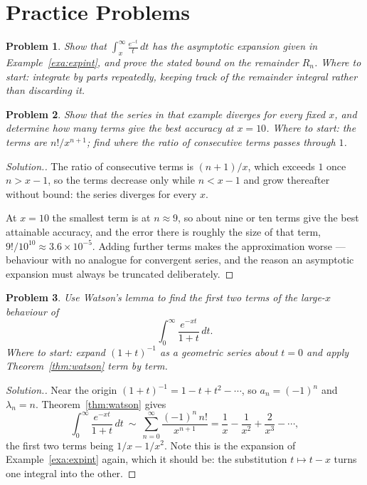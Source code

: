 \documentclass[12pt,a4paper]{report}
\theoremstyle{definition}
\theoremstyle{plain}
\newtheorem{problemx}{Problem}[section]
\newenvironment{problem}{\begin{problemx}}{\end{problemx}}
\newenvironment{solution}
  {\renewcommand{\qedsymbol}{}\begin{proof}[\textit{Solution}.]}
  {\end{proof}}
\begin{document}
\section{Practice Problems}

\begin{problem}
Show that $\displaystyle\int^{\infty}_{x}\frac{e^{-t}}{t}\,dt$ has the
asymptotic expansion given in Example~\ref{exa:expint}, and prove the stated bound on the
remainder $R_n$.
\emph{Where to start: integrate by parts repeatedly, keeping track of the
remainder integral rather than discarding it.}
\end{problem}

\begin{problem}
Show that the series in that example diverges for every fixed $x$, and determine
how many terms give the best accuracy at $x=10$.
\emph{Where to start: the terms are $n!/x^{n+1}$; find where the ratio of
consecutive terms passes through $1$.}
\end{problem}

\begin{solution}
The ratio of consecutive terms is $(n+1)/x$, which exceeds $1$ once $n>x-1$, so
the terms decrease only while $n<x-1$ and grow thereafter without bound: the
series diverges for every $x$.

At $x=10$ the smallest term is at $n\approx9$, so about nine or ten terms give
the best attainable accuracy, and the error there is roughly the size of that
term, $9!/10^{10}\approx 3.6\times10^{-5}$. Adding further terms makes the
approximation worse --- behaviour with no analogue for convergent series, and
the reason an asymptotic expansion must always be truncated deliberately.
\end{solution}

\begin{problem}
Use Watson's lemma to find the first two terms of the large-$x$ behaviour of
$$\int^{\infty}_{0}\frac{e^{-xt}}{1+t}\,dt .$$
\emph{Where to start: expand $(1+t)^{-1}$ as a geometric series about $t=0$ and
apply Theorem~\ref{thm:watson} term by term.}
\end{problem}

\begin{solution}
Near the origin $(1+t)^{-1} = 1 - t + t^{2} - \cdots$, so $a_n = (-1)^{n}$ and
$\lambda_n = n$. Theorem~\ref{thm:watson} gives
$$\int^{\infty}_{0}\frac{e^{-xt}}{1+t}\,dt
\ \sim\ \sum^{\infty}_{n=0}\frac{(-1)^{n}\,n!}{x^{n+1}}
= \frac{1}{x} - \frac{1}{x^{2}} + \frac{2}{x^{3}} - \cdots,$$
the first two terms being $1/x - 1/x^{2}$. Note this is the expansion of
Example~\ref{exa:expint} again, which it should be: the substitution $t\mapsto t-x$ turns
one integral into the other.
\end{solution}
\end{document}
